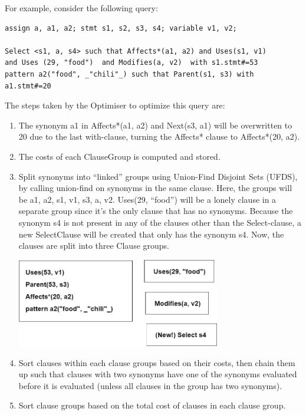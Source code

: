 \documentclass[12pt]{article}
\begin{document}
{{{{{{{{{{{{{For example, consider the following query:
\begin{verbatim}
assign a, a1, a2; stmt s1, s2, s3, s4; variable v1, v2;

Select <s1, a, s4> such that Affects*(a1, a2) and Uses(s1, v1) 
and Uses (29, "food")  and Modifies(a, v2)  with s1.stmt#=53 
pattern a2("food", _"chili"_) such that Parent(s1, s3) with a1.stmt#=20
\end{verbatim}

The steps taken by the Optimiser to optimize this query are: 
\begin{enumerate}
\item The synonym a1 in Affects*(a1, a2) and Next(s3, a1) will be overwritten to 20 due to the last with-clause, turning the Affects* clause to Affects*(20, a2).
\item The costs of each ClauseGroup is computed and stored.
\item Split synonyms into “linked” groups using Union-Find Disjoint Sets (UFDS), by calling union-find on synonyms in the same clause. Here, the groups will be {a1, a2, s1, v1, s3}, {a, v2}. Uses(29, “food”) will be a lonely clause in a separate group since it’s the only clause that has no synonyms. Because the synonym s4 is not present in any of the clauses other than the Select-clause, a new SelectClause will be created that only has the synonym s4. Now, the clauses are split into three Clause groups.
\begin{center}
\begin{minipage}{\linewidth}
\centering
\includegraphics[width=0.7\textwidth]{Optimizer1}
\end{minipage}
\end{center}
\item Sort clauses within each clause groups based on their costs, then chain them up such that clauses with two synonyms have one of the synonyms evaluated before it is evaluated (unless all clauses in the group has two synonyms).
\item Sort clause groups based on the total cost of clauses in each clause group.
\begin{center}

\end{center}
\end{enumerate}}}}}}}}}}}}}}
\end{document}
